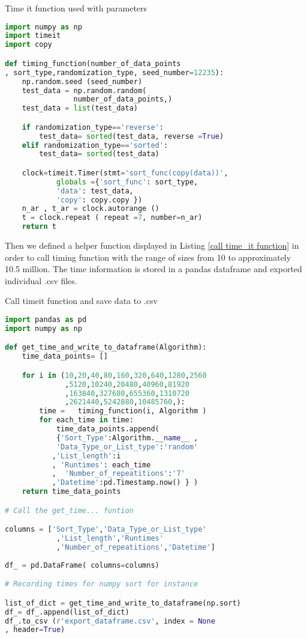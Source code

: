 \documentclass[sigconf, nonacm, natbib, screen, balance=False]{acmart}
\begin{document}
\begin{listing}
  \caption{Time it function used with parameters}
  \label{time_it function}
\begin{lstlisting}[language=Python]
import numpy as np
import timeit
import copy

def timing_function(number_of_data_points
, sort_type,randomization_type, seed_number=12235):
    np.random.seed (seed_number)
    test_data = np.random.random(
                number_of_data_points,)
    test_data = list(test_data)

    if randomization_type=='reverse':
        test_data= sorted(test_data, reverse =True)
    elif randomization_type=='sorted':
        test_data= sorted(test_data)

    clock=timeit.Timer(stmt='sort_func(copy(data))',
            globals ={'sort_func': sort_type,
            'data': test_data,
            'copy': copy.copy })
    n_ar , t_ar = clock.autorange ()
    t = clock.repeat ( repeat =7, number=n_ar)
    return t
\end{lstlisting}
\end{listing}

Then we defined a helper function displayed in Listing  \ref{call time_it function} in order to call timing function with the range of sizes from 10 to approximately 10.5 million. The time information is stored in a pandas dataframe and exported  individual .csv files.


\begin{listing}
  \caption{Call timeit function and save data to .csv}
  \label{call time_it function}
\begin{lstlisting}[language=Python]
import pandas as pd
import numpy as np

def get_time_and_write_to_dataframe(Algorithm):
    time_data_points= []

    for i in (10,20,40,80,160,320,640,1280,2560
              ,5120,10240,20480,40960,81920
              ,163840,327680,655360,1310720
              ,2621440,5242880,10485760,):
        time =   timing_function(i, Algorithm ) 
        for each_time in time:
            time_data_points.append( 
            {'Sort_Type':Algorithm.__name__ ,
            'Data_Type_or_List_type':'random'
           ,'List_length':i
           , 'Runtimes': each_time 
           ,  'Number_of_repeatitions':'7'
           ,'Datetime':pd.Timestamp.now() } )
    return time_data_points   

# Call the get_time... funtion 

columns = ['Sort_Type','Data_Type_or_List_type'
            ,'List_length','Runtimes'
            ,'Number_of_repeatitions','Datetime']
            
df_ = pd.DataFrame( columns=columns)

# Recording times for numpy sort for instance

list_of_dict = get_time_and_write_to_dataframe(np.sort)
df_= df_.append(list_of_dict)
df_.to_csv (r'export_dataframe.csv', index = None
, header=True)
\end{lstlisting}
\end{listing}
\end{document}
